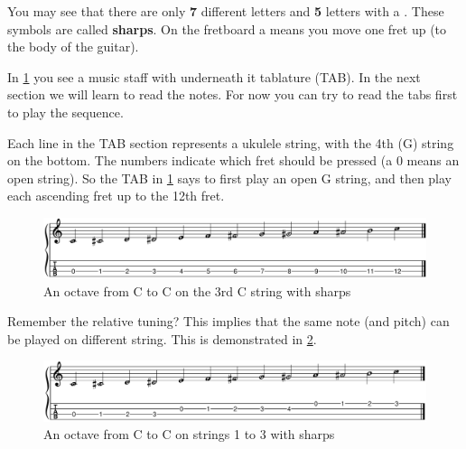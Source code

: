 You may see that there are only \textbf{7} different letters and \textbf{5} letters with a \textbf{\sharp}. These \sharp symbols are called \textbf{sharps}. On the fretboard a \sharp means you move one fret up (to the body of the guitar).


In \ref{fig:ukulele_single_string_octave_sharps} you see a music staff with underneath it tablature (TAB). In the next section we will learn to read the notes. For now you can try to read the tabs first to play the sequence.

Each line in the TAB section represents a ukulele string, with the 4th (G) string on the bottom. The numbers indicate which fret should be pressed (a 0 means an open string). So the TAB in \ref{fig:ukulele_single_string_octave_sharps} says to first play an open G string, and then play each ascending fret up to the 12th fret.

\begin{figure}[h]
    \centering
    \includegraphics[width=\textwidth]{../../MuseScore/Ukulele/UkuleleChromaticNotesSharpsSingleString.png}
    \caption{An octave from C to C on the 3rd C string with sharps}
    \label{fig:ukulele_single_string_octave_sharps}
\end{figure}

 Remember the relative tuning? This implies that the same note (and pitch) can be played on different string. This is demonstrated in \ref{fig:ukulele_multi_string_octave_sharps}.

\begin{figure}[h]
    \centering
    \includegraphics[width=\textwidth]{../../MuseScore/Ukulele/UkuleleChromaticNotesSharpsMultiString.png}
    \caption{An octave from C to C on strings 1 to 3 with sharps}
    \label{fig:ukulele_multi_string_octave_sharps}
\end{figure}

